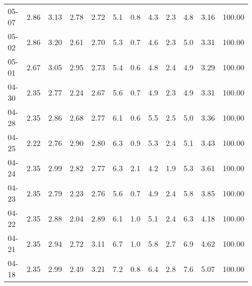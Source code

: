 \begin{threeparttable}
{\begin{tabular}{lrrrrrrrrrrr}
  05-07 &          2.86 &          3.13 &          2.78 &        2.72 &                 5.1 &                 0.8 &        4.3 &                 2.3 &              4.8 &            3.16 &                 100.00 \\
  05-02 &          2.86 &          3.20 &          2.61 &        2.70 &                 5.3 &                 0.7 &        4.6 &                 2.3 &              5.0 &            3.31 &                 100.00 \\
  05-01 &          2.67 &          3.05 &          2.95 &        2.73 &                 5.4 &                 0.6 &        4.8 &                 2.4 &              4.9 &            3.29 &                 100.00 \\
  04-30 &          2.35 &          2.77 &          2.24 &        2.67 &                 5.6 &                 0.7 &        4.9 &                 2.3 &              4.9 &            3.31 &                 100.00 \\
  04-28 &          2.35 &          2.86 &          2.68 &        2.77 &                 6.1 &                 0.6 &        5.5 &                 2.5 &              5.0 &            3.36 &                 100.00 \\
  04-25 &          2.22 &          2.76 &          2.90 &        2.80 &                 6.3 &                 0.9 &        5.3 &                 2.4 &              5.1 &            3.43 &                 100.00 \\
  04-24 &          2.35 &          2.99 &          2.82 &        2.77 &                 6.3 &                 2.1 &        4.2 &                 1.9 &              5.3 &            3.61 &                 100.00 \\
  04-23 &          2.35 &          2.79 &          2.23 &        2.76 &                 5.6 &                 0.7 &        4.9 &                 2.4 &              5.8 &            3.85 &                 100.00 \\
  04-22 &          2.35 &          2.88 &          2.04 &        2.89 &                 6.1 &                 1.0 &        5.1 &                 2.4 &              6.3 &            4.18 &                 100.00 \\
  04-21 &          2.35 &          2.94 &          2.72 &        3.11 &                 6.7 &                 1.0 &        5.8 &                 2.7 &              6.9 &            4.62 &                 100.00 \\
  04-18 &          2.35 &          2.99 &          2.49 &        3.21 &                 7.2 &                 0.8 &        6.4 &                 2.8 &              7.6 &            5.07 &                 100.00 \\

\end{tabular}}
\end{threeparttable}
